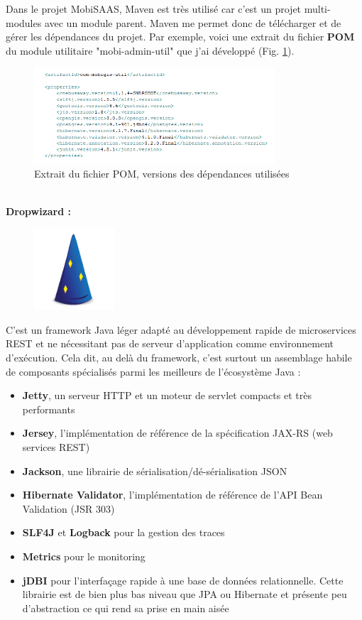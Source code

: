 \begin{itemize}
Dans le projet MobiSAAS, Maven est très utilisé car c'est un projet multi-modules avec un module parent. Maven me permet donc de télécharger et de gérer les dépendances du projet. Par exemple, voici une extrait du fichier \textbf{POM} du module utilitaire "mobi-admin-util" que j'ai développé (Fig. \ref{fig:MavenPOM}). 
\\
\begin{figure}[h]
	\centering
		\includegraphics[width=0.8\textwidth]{images/Maven_POM_properties_Mobi-Admin-util.PNG}
	\caption{\label{fig:MavenPOM}Extrait du fichier POM, versions des dépendances utilisées}
\end{figure}\\


\textbf{Dropwizard :}\label{Dropwizard}

\begin{figure}
\centering
\includegraphics[width=3cm]{images/dropwizard.png}
\end{figure}
\noindent C'est un framework Java léger adapté au développement rapide de microservices REST et ne nécessitant pas de serveur d'application comme environnement d'exécution.
Cela dit, au delà du framework, c'est surtout un assemblage habile de composants spécialisés parmi les meilleurs de l'écosystème Java :
\begin{itemize}
\item \textbf{Jetty}, un serveur HTTP et un moteur de servlet compacts et très performants 
\item \textbf{Jersey}, l'implémentation de référence de la spécification JAX-RS (web services REST) 
\item \textbf{Jackson}, une librairie de sérialisation/dé-sérialisation JSON 
\item \textbf{Hibernate Validator}, l'implémentation de référence de l'API Bean Validation (JSR 303) 
\item \textbf{SLF4J} et \textbf{Logback} pour la gestion des traces 
\item \textbf{Metrics} pour le monitoring 
\item \textbf{jDBI} pour l'interfaçage rapide à une base de données relationnelle. Cette librairie est de bien plus bas niveau que JPA ou Hibernate et présente peu d'abstraction ce qui rend sa prise en main aisée \\
\end{itemize}


\end{itemize}
